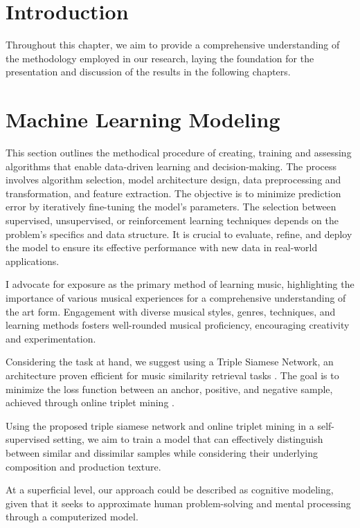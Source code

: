 \section{Introduction}

Throughout this chapter, we aim to provide a comprehensive understanding of the methodology employed in our research, laying the foundation for the presentation and discussion of the results in the following chapters.

\section{Machine Learning Modeling}

This section outlines the methodical procedure of creating, training and assessing algorithms that enable data-driven learning and decision-making. The process involves algorithm selection, model architecture design, data preprocessing and transformation, and feature extraction. The objective is to minimize prediction error by iteratively fine-tuning the model's parameters. The selection between supervised, unsupervised, or reinforcement learning techniques depends on the problem's specifics and data structure. It is crucial to evaluate, refine, and deploy the model to ensure its effective performance with new data in real-world applications.

I advocate for exposure as the primary method of learning music, highlighting the importance of various musical experiences for a comprehensive understanding of the art form. Engagement with diverse musical styles, genres, techniques, and learning methods fosters well-rounded musical proficiency, encouraging creativity and experimentation.

Considering the task at hand, we suggest using a Triple Siamese Network, an architecture proven efficient for music similarity retrieval tasks \cite{contentmusicsimtriplet2020}. The goal is to minimize the loss function between an anchor, positive, and negative sample, achieved through online triplet mining \cite{Sikaroudi2020OfflinePatches}. 

Using the proposed triple siamese network and online triplet mining in a self-supervised setting, we aim to train a model that can effectively distinguish between similar and dissimilar samples while considering their underlying composition and production texture.

At a superficial level, our approach could be described as cognitive modeling, given that it seeks to approximate human problem-solving and mental processing through a computerized model.

